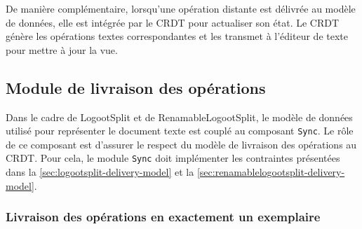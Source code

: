\documentclass[12pt]{thesul}
\begin{document}
De manière complémentaire, lorsqu'une opération distante est délivrée au modèle de données, elle est intégrée par le \ac{CRDT} pour actualiser son état.
Le \ac{CRDT} génère les opérations textes correspondantes et les transmet à l'éditeur de texte pour mettre à jour la vue.

\subsection{Module de livraison des opérations}

Dans le cadre de LogootSplit et de RenamableLogootSplit, le modèle de données utilisé pour représenter le document texte est couplé au composant \texttt{Sync}.
Le rôle de ce composant est d'assurer le respect du modèle de livraison des opérations au \ac{CRDT}.
Pour cela, le module \texttt{Sync} doit implémenter les contraintes présentées dans la \autoref{sec:logootsplit-delivery-model} et la \autoref{sec:renamablelogootsplit-delivery-model}.

\subsubsection{Livraison des opérations en exactement un exemplaire}
\end{document}
